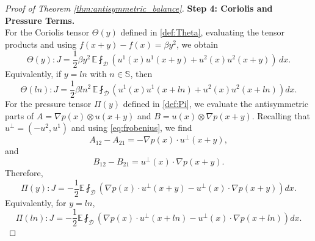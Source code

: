 \documentclass[11pt,a4paper]{article}
\numberwithin{equation}{section}
\numberwithin{theorem}{section}
\numberwithin{remark}{section}
\numberwithin{definition}{section}
\begin{document}
\begin{proof}[Proof of Theorem \ref{thm:antisymmetric_balance}]
\noindent \textbf{Step 4: Coriolis and Pressure Terms.}\\
For the Coriolis tensor $\varTheta(y)$ defined in \eqref{def:Theta}, 
evaluating the tensor products and using 
$f(x+y)-f(x)=\beta y^2$, we obtain
\begin{equation}
    \varTheta(y) : J = \frac{1}{2}\beta y^2 \, \mathbb{E} \fint_{\mathcal{D}} \left(
    u^1(x)u^1(x+y) + u^2(x)u^2(x+y)\right)\,dx .
\end{equation}
Equivalently, if $y=ln$ with $n\in\mathbb S$, then
\begin{equation}\label{eq:anti_coriolis}
    \varTheta(ln) : J = \frac{1}{2} \beta l n^2 \, \mathbb{E} \fint_{\mathcal{D}} \left( u^1(x)u^1(x+ln) + u^2(x)u^2(x+ln) \right) dx.
\end{equation}
For the pressure tensor $\Pi(y)$ defined in \eqref{def:Pi}, we evaluate the 
antisymmetric parts of 
$A=\nabla p(x)\otimes u(x+y)$ and 
$B=u(x)\otimes \nabla p(x+y)$. Recalling that 
$u^\perp=(-u^2,u^1)$ and using \eqref{eq:frobenius}, we find
\begin{equation*}
    A_{12}-A_{21}=-\nabla p(x)\cdot u^\perp(x+y),
\end{equation*}
and
\begin{equation*}
    B_{12}-B_{21}=u^\perp(x)\cdot \nabla p(x+y).
\end{equation*}
Therefore,
\begin{equation}
    \Pi(y):J=-\frac12\mathbb{E}\fint_{\mathcal D}\left(\nabla p(x)\cdot u^\perp(x+y)-u^\perp(x)\cdot\nabla p(x+y)\right)dx.
\end{equation}
Equivalently, for $y=ln$,
\begin{equation}\label{eq:anti_pressure}
    \Pi(ln):J=-\frac12 \mathbb{E}\fint_{\mathcal D}\left( \nabla p(x)\cdot u^\perp(x+ln)-u^\perp(x)\cdot\nabla p(x+ln)\right)dx.
\end{equation}

\text{}


\end{proof}
\end{document}
